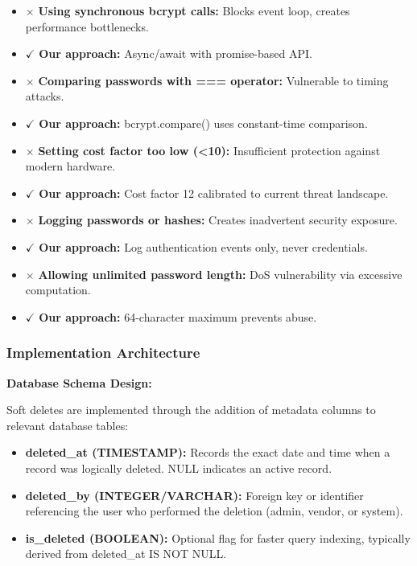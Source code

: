 \documentclass[12pt,a4paper]{article}
\begin{document}
\begin{itemize}[leftmargin=2em, itemsep=6pt]
    \item $\times$ \textbf{Using synchronous bcrypt calls:} Blocks event loop, creates performance bottlenecks.
    \item $\checkmark$ \textbf{Our approach:} Async/await with promise-based API.
    
    \item $\times$ \textbf{Comparing passwords with === operator:} Vulnerable to timing attacks.
    \item $\checkmark$ \textbf{Our approach:} bcrypt.compare() uses constant-time comparison.
    
    \item $\times$ \textbf{Setting cost factor too low (<10):} Insufficient protection against modern hardware.
    \item $\checkmark$ \textbf{Our approach:} Cost factor 12 calibrated to current threat landscape.
    
    \item $\times$ \textbf{Logging passwords or hashes:} Creates inadvertent security exposure.
    \item $\checkmark$ \textbf{Our approach:} Log authentication events only, never credentials.
    
    \item $\times$ \textbf{Allowing unlimited password length:} DoS vulnerability via excessive computation.
    \item $\checkmark$ \textbf{Our approach:} 64-character maximum prevents abuse.
\end{itemize}

\subsubsection{Implementation Architecture}

\textbf{Database Schema Design:}

Soft deletes are implemented through the addition of metadata columns to relevant database tables:

\begin{itemize}[leftmargin=2em, itemsep=8pt]
    \item \textbf{deleted\_at (TIMESTAMP):} Records the exact date and time when a record was logically deleted. NULL indicates an active record.
    \item \textbf{deleted\_by (INTEGER/VARCHAR):} Foreign key or identifier referencing the user who performed the deletion (admin, vendor, or system).
    \item \textbf{is\_deleted (BOOLEAN):} Optional flag for faster query indexing, typically derived from deleted\_at IS NOT NULL.
\end{itemize}
\end{document}
